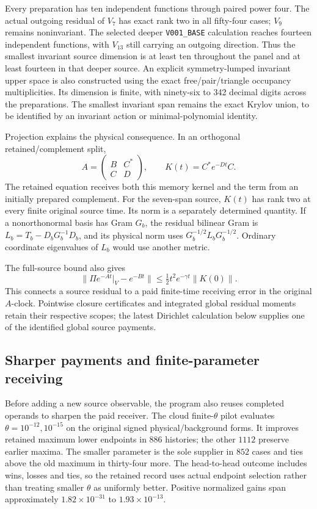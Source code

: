 Every preparation has ten independent functions through paired power four. The actual outgoing residual of $V_7$ has exact rank two in all fifty-four cases; $V_9$ remains noninvariant. The selected deeper \texttt{V001\_BASE} calculation reaches fourteen independent functions, with $V_{13}$ still carrying an outgoing direction. Thus the smallest invariant source dimension is at least ten throughout the panel and at least fourteen in that deeper source. An explicit symmetry-lumped invariant upper space is also constructed using the exact free/pair/triangle occupancy multiplicities. Its dimension is finite, with ninety-six to 342 decimal digits across the preparations. The smallest invariant span remains the exact Krylov union, to be identified by an invariant action or minimal-polynomial identity.

Projection explains the physical consequence. In an orthogonal retained/complement split,
\[
 A=\begin{pmatrix}B&C^*\\C&D\end{pmatrix},\qquad
 K(t)=C^*e^{-Dt}C.
\]
The retained equation receives both this memory kernel and the term from an initially prepared complement. For the seven-span source, $K(t)$ has rank two at every finite original source time. Its norm is a separately determined quantity. If a nonorthonormal basis has Gram $G_b$, the residual bilinear Gram is $L_b=T_b-D_bG_b^{-1}D_b$, and its physical norm uses $G_b^{-1/2}L_bG_b^{-1/2}$. Ordinary coordinate eigenvalues of $L_b$ would use another metric.

The full-source bound also gives
\[
 \|\Pi e^{-At}|_V-e^{-Bt}\|
 \leq\tfrac12t^2e^{-\gamma t}\|K(0)\|.
\]
This connects a source residual to a paid finite-time receiving error in the original $A$-clock. Pointwise closure certificates and integrated global residual moments retain their respective scopes; the latest Dirichlet calculation below supplies one of the identified global source payments.

\subsection{Sharper payments and finite-parameter receiving}

Before adding a new source observable, the program also reuses completed operands to sharpen the paid receiver. The cloud finite-$\theta$ pilot evaluates $\theta=10^{-12},10^{-15}$ on the original signed physical/background forms. It improves retained maximum lower endpoints in $886$ histories; the other $1112$ preserve earlier maxima. The smaller parameter is the sole supplier in $852$ cases and ties above the old maximum in thirty-four more. The head-to-head outcome includes wins, losses and ties, so the retained record uses actual endpoint selection rather than treating smaller $\theta$ as uniformly better. Positive normalized gains span approximately $1.82\times10^{-31}$ to $1.93\times10^{-13}$. 

